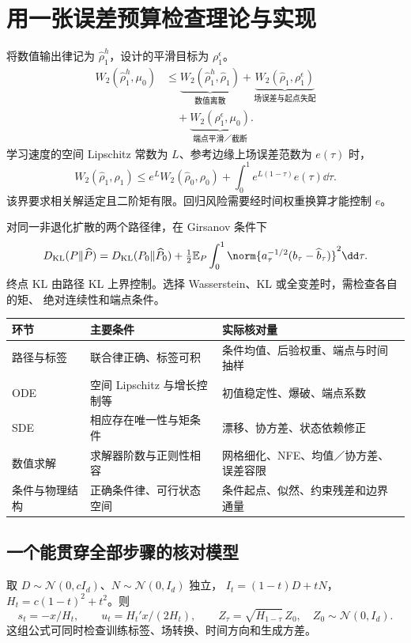 \documentclass[language=chinese,margin=right,11pt]{lumenbook}
\begin{document}
\clearpage
\section*{用一张误差预算检查理论与实现}

将数值输出律记为 \(\widehat\rho_1^h\)，设计的平滑目标为 \(\rho_1^\epsilon\)。
\[
 \begin{aligned}
 W_2(\widehat\rho_1^h,\mu_0)
 &\le\underbrace{W_2(\widehat\rho_1^h,\widehat\rho_1)}_{\text{数值离散}}+
       \underbrace{W_2(\widehat\rho_1,\rho_1^\epsilon)}_{\text{场误差与起点失配}}\\
 &\quad+\underbrace{W_2(\rho_1^\epsilon,\mu_0)}_{\text{端点平滑／截断}}.
 \end{aligned}
\]
学习速度的空间 Lipschitz 常数为 \(L\)、参考边缘上场误差范数为 \(e(\tau)\) 时，
\[
 W_2(\widehat\rho_1,\rho_1)
 \le e^L W_2(\widehat\rho_0,\rho_0)+\int_0^1e^{L(1-\tau)}e(\tau)\dd\tau.
\]
该界要求相关解适定且二阶矩有限。回归风险需要经时间权重换算才能控制 \(e\)。

对同一非退化扩散的两个路径律，在 Girsanov 条件下
\[
 D_{\mathrm{KL}}(P\|\widehat P)
 =D_{\mathrm{KL}}(P_0\|\widehat P_0)
 +\tfrac12\mathbb E_P\int_0^1\norm{a_\tau^{-1/2}(b_\tau-\widehat b_\tau)}^2\dd\tau.
\]
终点 KL 由路径 KL 上界控制。选择 Wasserstein、KL 或全变差时，需检查各自的矩、
绝对连续性和端点条件。

\par\noindent
\begin{tabularx}{\textwidth}{@{}llX@{}}
\toprule
环节 & 主要条件 & 实际核对量 \\
\midrule
路径与标签 & 联合律正确、标签可积 & 条件均值、后验权重、端点与时间抽样 \\
ODE & 空间 Lipschitz 与增长控制等 & 初值稳定性、爆破、端点系数 \\
SDE & 相应存在唯一性与矩条件 & 漂移、协方差、状态依赖修正 \\
数值求解 & 求解器阶数与正则性相容 & 网格细化、NFE、均值／协方差、误差容限 \\
条件与物理结构 & 正确条件律、可行状态空间 & 条件起点、似然、约束残差和边界通量 \\
\bottomrule
\end{tabularx}

\subsection*{一个能贯穿全部步骤的核对模型}
取 \(D\sim\mathcal N(0,cI_d)\)、\(N\sim\mathcal N(0,I_d)\) 独立，
\(I_t=(1-t)D+tN\)，\(H_t=c(1-t)^2+t^2\)。则
\[
 s_t=-x/H_t,\qquad u_t=H_t'x/(2H_t),\qquad
 Z_\tau=\sqrt{H_{1-\tau}}\,Z_0,\quad Z_0\sim\mathcal N(0,I_d).
\]
这组公式可同时检查训练标签、场转换、时间方向和生成方差。
\end{document}
